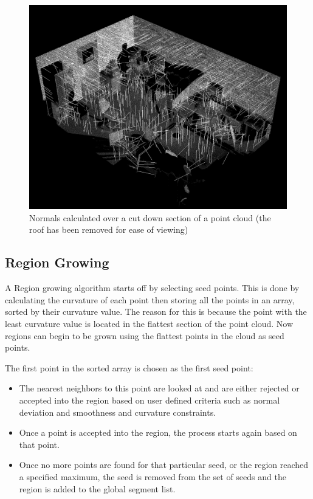 			\begin{figure}[H]
			\centering
			\includegraphics[width=0.7\linewidth]{Includes/images/Normals}
			\caption{Normals calculated over a cut down section of a point cloud (the roof has been removed for ease of viewing)}
			\label{fig:Normals}
			\end{figure}
		

				
	\subsection{Region Growing}
		
		A Region growing algorithm starts off by selecting seed points. This is done by calculating the curvature of each point then storing all the points in an array, sorted by their curvature value. The reason for this is because the point with the least curvature value is located in the flattest section of the point cloud. Now regions can begin to be grown using the flattest points in the cloud as seed points. 
		
		The first point in the sorted array is chosen as the first seed point:
		
		\begin{itemize}
			
			\item The nearest neighbors to this point are looked at and are either rejected or accepted into the region based on user defined criteria such as normal deviation and smoothness and curvature constraints.
			
			\item Once a point is accepted into the region, the process starts again based on that point.
			
			\item Once no more points are found for that particular seed, or the region reached a specified maximum, the seed is removed from the set of seeds and the region is added to the global segment list. 
			
		\end{itemize}
		
